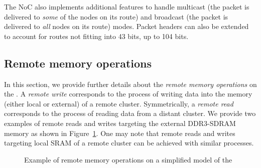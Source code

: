 \documentclass[main.tex]{subfiles}
\begin{document}

The NoC also implements additional features to handle multicast (the packet is delivered to \emph{some} of the nodes on its route) and broadcast (the packet is delivered to \emph{all} nodes on its route) modes. Packet headers can also be extended to account for routes not fitting into 43 bits, up to 104 bits.


\subsection{Remote memory operations}
In this section, we provide further details about the \emph{remote memory operations} on the \mppalong. A \emph{remote write} corresponds to the process of writing data into the memory (either local or external) of a remote cluster. Symmetrically, a \emph{remote read} corresponds to the process of reading data from a distant cluster. We provide two examples of remote reads and writes targeting the external DDR3-SDRAM memory as shown in Figure~\ref{systemModel_MPPAremoteMem}. One may note that remote reads and writes targeting local SRAM of a remote cluster can be achieved with similar processes.


\begin{figure}
\begin{center}
    
	\caption{Example of remote memory operations on a simplified model of the \mppalong}
	\label{systemModel_MPPAremoteMem}
\end{center}
\end{figure}
\end{document}
